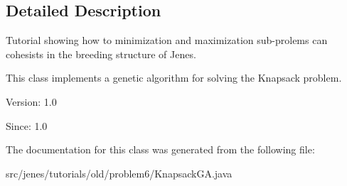\subsection{Detailed Description}
Tutorial showing how to minimization and maximization sub-prolems can cohesists in the breeding structure of Jenes.

This class implements a genetic algorithm for solving the Knapsack problem.

\begin{Desc}
\item[Version:]1.0\end{Desc}
\begin{Desc}
\item[Since:]1.0 \end{Desc}


The documentation for this class was generated from the following file:\begin{CompactItemize}
\item 
src/jenes/tutorials/old/problem6/KnapsackGA.java\end{CompactItemize}
